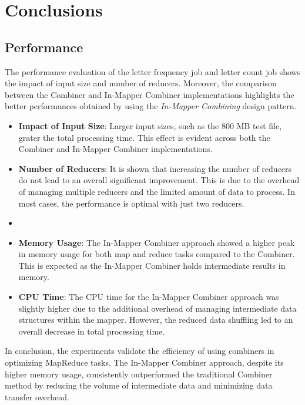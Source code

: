 \newpage
\section{Conclusions}

\subsection{Performance}

The performance evaluation of the letter frequency job and letter count job shows the impact of input size and number of reducers. Moreover, the comparison between the Combiner and In-Mapper Combiner implementations highlights the better performances obtained by using the \textit{In-Mapper Combining} design pattern.

\begin{itemize}
\item \textbf{Impact of Input Size}: Larger input sizes, such as the 800 MB test file, grater the total processing time. This effect is evident across both the Combiner and In-Mapper Combiner implementations.
\item \textbf{Number of Reducers}: It is shown that increasing the number of reducers do not lead to an overall significant improvement. This is due to the overhead of managing multiple reducers and the limited amount of data to process. In most cases, the performance is optimal with just two reducers.
\item 
\item \textbf{Memory Usage}: The In-Mapper Combiner approach showed a higher peak in memory usage for both map and reduce tasks compared to the Combiner. This is expected as the In-Mapper Combiner holds intermediate results in memory.

\item \textbf{CPU Time}: The CPU time for the In-Mapper Combiner approach was slightly higher due to the additional overhead of managing intermediate data structures within the mapper. However, the reduced data shuffling led to an overall decrease in total processing time.
\end{itemize}

\noindent In conclusion, the experiments validate the efficiency of using combiners in optimizing MapReduce tasks. The In-Mapper Combiner approach, despite its higher memory usage, consistently outperformed the traditional Combiner method by reducing the volume of intermediate data and minimizing data transfer overhead. 
